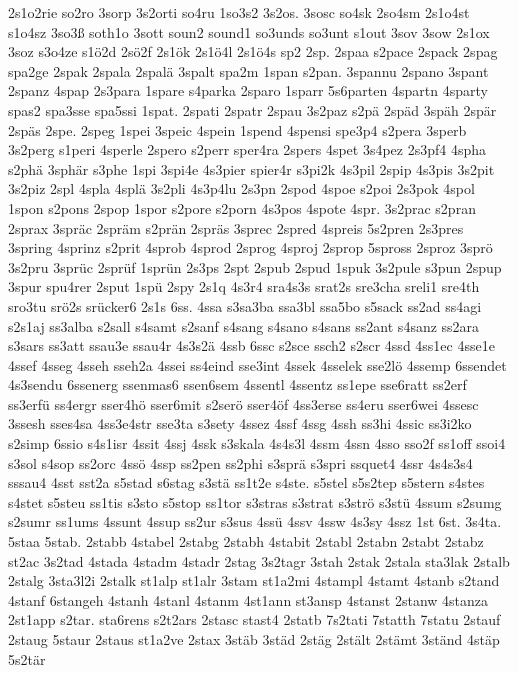 {2s1o2rie
so2ro
3sorp
3s2orti
so4ru
1so3s2
3s2os.
3sosc
so4sk
2so4sm
2s1o4st
s1o4sz
3so3ß
soth1o
3sott
soun2
sound1
so3unds
so3unt
s1out
3sov
3sow
2s1ox
3soz
s3o4ze
s1ö2d
2sö2f
2s1ök
2s1ö4l
2s1ö4s
sp2
2sp.
2spaa
s2pace
2spack
2spag
spa2ge
2spak
2spala
2spalä
3spalt
spa2m
1span
s2pan.
3spannu
2spano
3spant
2spanz
4spap
2s3para
1spare
s4parka
2sparo
1sparr
5s6parten
4spartn
4sparty
spas2
spa3sse
spa5ssi
1spat.
2spati
2spatr
2spau
3s2paz
s2pä
2späd
3späh
2spär
2späs
2spe.
2speg
1spei
3speic
4spein
1spend
4spensi
spe3p4
s2pera
3sperb
3s2perg
s1peri
4sperle
2spero
s2perr
sper4ra
2spers
4spet
3s4pez
2s3pf4
4spha
s2phä
3sphär
s3phe
1spi
3spi4e
4s3pier
spier4r
s3pi2k
4s3pil
2spip
4s3pis
3s2pit
3s2piz
2spl
4spla
4splä
3s2pli
4s3p4lu
2s3pn
2spod
4spoe
s2poi
2s3pok
4spol
1spon
s2pons
2spop
1spor
s2pore
s2porn
4s3pos
4spote
4spr.
3s2prac
s2pran
2sprax
3spräc
2spräm
s2prän
2spräs
3sprec
2spred
4spreis
5s2pren
2s3pres
3spring
4sprinz
s2prit
4sprob
4sprod
2sprog
4sproj
2sprop
5spross
2sproz
3sprö
3s2pru
3sprüc
2sprüf
1sprün
2s3ps
2spt
2spub
2spud
1spuk
3s2pule
s3pun
2spup
3spur
spu4rer
2sput
1spü
2spy
2s1q
4s3r4
sra4s3s
srat2s
sre3cha
sreli1
sre4th
sro3tu
srö2s
srücker6
2s1s
6ss.
4ssa
s3sa3ba
ssa3bl
ssa5bo
s5sack
ss2ad
ss4agi
s2s1aj
ss3alba
s2sall
s4samt
s2sanf
s4sang
s4sano
s4sans
ss2ant
s4sanz
ss2ara
s3sars
ss3att
ssau3e
ssau4r
4s3s2ä
4ssb
6ssc
s2sce
ssch2
s2scr
4ssd
4ss1ec
4sse1e
4ssef
4sseg
4sseh
sseh2a
4ssei
ss4eind
sse3int
4ssek
4sselek
sse2lö
4ssemp
6ssendet
4s3sendu
6ssenerg
ssenmas6
ssen6sem
4ssentl
4ssentz
ss1epe
sse6ratt
ss2erf
ss3erfü
ss4ergr
sser4hö
sser6mit
s2serö
sser4öf
4ss3erse
ss4eru
sser6wei
4ssesc
3ssesh
sses4sa
4ss3e4str
sse3ta
s3sety
4ssez
4ssf
4ssg
4ssh
ss3hi
4ssic
ss3i2ko
s2simp
6ssio
s4s1isr
4ssit
4ssj
4ssk
s3skala
4s4s3l
4ssm
4ssn
4sso
sso2f
ss1off
ssoi4
s3sol
s4sop
ss2orc
4ssö
4ssp
ss2pen
ss2phi
s3sprä
s3spri
ssquet4
4ssr
4s4s3s4
sssau4
4sst
sst2a
s5stad
s6stag
s3stä
ss1t2e
s4ste.
s5stel
s5s2tep
s5stern
s4stes
s4stet
s5steu
ss1tis
s3sto
s5stop
ss1tor
s3stras
s3strat
s3strö
s3stü
4ssum
s2sumg
s2sumr
ss1ums
4ssunt
4ssup
ss2ur
s3sus
4ssü
4ssv
4ssw
4s3sy
4ssz
1st
6st.
3s4ta.
5staa
5stab.
2stabb
4stabel
2stabg
2stabh
4stabit
2stabl
2stabn
2stabt
2stabz
st2ac
3s2tad
4stada
4stadm
4stadr
2stag
3s2tagr
3stah
2stak
2stala
sta3lak
2stalb
2stalg
3sta3l2i
2stalk
st1alp
st1alr
3stam
st1a2mi
4stampl
4stamt
4stanb
s2tand
4stanf
6stangeh
4stanh
4stanl
4stanm
4st1ann
st3ansp
4stanst
2stanw
4stanza
2st1app
s2tar.
sta6rens
s2t2ars
2stasc
stast4
2statb
7s2tati
7statth
7statu
2stauf
2staug
5staur
2staus
st1a2ve
2stax
3stäb
3städ
2stäg
2stält
2stämt
3ständ
4stäp
5s2tär
}
